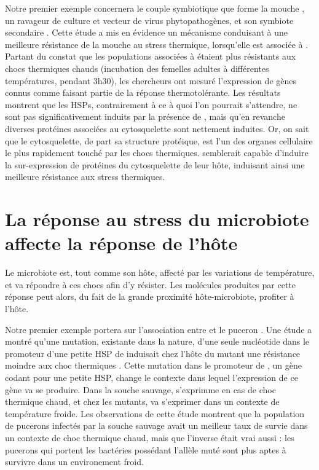 Notre premier exemple concernera le couple symbiotique que forme la mouche , un ravageur de culture et vecteur de virus phytopathogènes, et son symbiote secondaire  \cite{brumin2011}.
Cette étude a mis en évidence un mécanisme conduisant à une meilleure résistance de la mouche au stress thermique, lorsqu'elle est associée à .
Partant du constat que les populations associées à  étaient plus résistants aux chocs thermiques chauds (incubation des femelles adultes à différentes températures, pendant 3h30), les chercheurs ont mesuré l'expression de gènes connus comme faisant partie de la réponse thermotolérante.
Les résultats montrent que les HSPs, contrairement à ce à quoi l'on pourrait s'attendre, ne sont pas significativement induits par la présence de , mais qu'en revanche diverses protéines associées au cytosquelette sont nettement induites.
Or, on sait que le cytosquelette, de part sa structure protéique, est l'un des organes cellulaire le plus rapidement touché par les chocs thermiques.
 semblerait capable d'induire la sur-expression de protéines du cytosquelette de leur hôte, induisant ainsi une meilleure résistance aux stress thermiques.


\section{La réponse au stress du microbiote affecte la réponse de l'hôte}

Le microbiote est, tout comme son hôte, affecté par les variations de température, et va répondre à ces chocs afin d'y résister.
Les molécules produites par cette réponse peut alors, du fait de la grande proximité hôte-microbiote, profiter à l'hôte.

Notre premier exemple portera sur l'association entre  et le puceron .
Une étude a montré qu'une mutation, existante dans la nature, d'une seule nucléotide dans le promoteur d'une petite HSP de  induisait chez l'hôte du mutant une résistance moindre aux choc thermiques \cite{dunbar2007}.
Cette mutation dans le promoteur de , un gène codant pour une petite HSP, change le contexte dans lequel l'expression de ce gène va se produire. Dans la souche sauvage,  s'exprimme en cas de choc thermique chaud, et chez les mutants,  va s'exprimer dans un contexte de température froide.
Les observations de cette étude montrent que la population de pucerons infectés par la souche sauvage avait un meilleur taux de survie dans un contexte de choc thermique chaud, mais que l'inverse était vrai aussi : les pucerons qui portent les bactéries possédant l'allèle muté sont plus aptes à survivre dans un environement froid.

